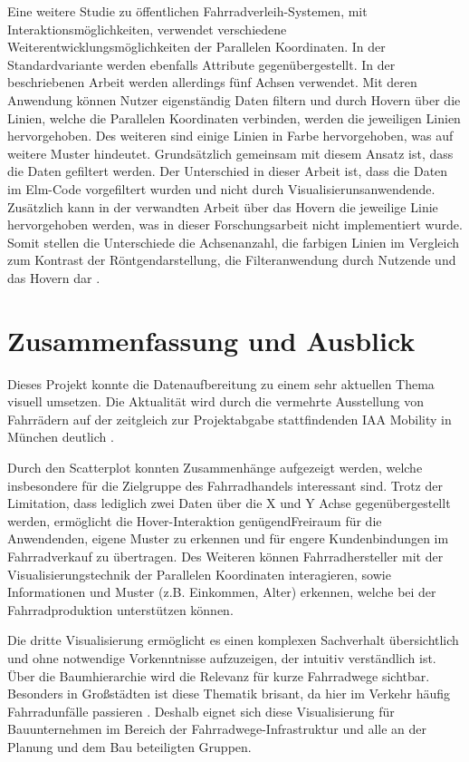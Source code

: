 \documentclass[usegeometry=true]{scrartcl}
\begin{document}
Eine weitere Studie zu öffentlichen Fahrradverleih-Systemen, mit Interaktionsmöglichkeiten, verwendet verschiedene Weiterentwicklungsmöglichkeiten der  Parallelen Koordinaten. In der Standardvariante werden ebenfalls Attribute gegenübergestellt. In der beschriebenen Arbeit werden allerdings fünf Achsen verwendet. Mit deren Anwendung können Nutzer eigenständig Daten filtern und durch Hovern über die Linien, welche die Parallelen Koordinaten verbinden, werden die jeweiligen Linien hervorgehoben. Des weiteren sind einige Linien in Farbe hervorgehoben, was auf weitere Muster hindeutet. Grundsätzlich gemeinsam mit diesem Ansatz ist, dass die Daten gefiltert werden. Der Unterschied in dieser Arbeit ist, dass die Daten im Elm-Code vorgefiltert wurden und nicht durch Visualisierunsanwendende. Zusätzlich kann in der verwandten Arbeit über das Hovern die jeweilige Linie hervorgehoben werden, was in dieser Forschungsarbeit nicht implementiert wurde. Somit stellen die Unterschiede die Achsenanzahl, die farbigen Linien im Vergleich zum Kontrast der Röntgendarstellung, die Filteranwendung durch Nutzende und das Hovern dar \cite{Shi.2018}.  
\section{Zusammenfassung und Ausblick}

Dieses Projekt konnte die Datenaufbereitung zu einem sehr aktuellen Thema visuell umsetzen. Die Aktualität wird durch die vermehrte Ausstellung von Fahrrädern auf der zeitgleich zur Projektabgabe stattfindenden IAA Mobility in München deutlich \cite{.08.09.2021}.

Durch den Scatterplot konnten Zusammenhänge aufgezeigt werden, welche insbesondere für die Zielgruppe des Fahrradhandels interessant sind. Trotz der Limitation, dass lediglich zwei Daten über die X und Y Achse gegenübergestellt werden, ermöglicht die Hover-Interaktion genügendFreiraum für die Anwendenden, eigene Muster zu erkennen und für engere Kundenbindungen im Fahrradverkauf zu übertragen. 
Des Weiteren können Fahrradhersteller mit der Visualisierungstechnik der Parallelen Koordinaten interagieren, sowie Informationen und Muster (z.B. Einkommen, Alter) erkennen, welche bei der Fahrradproduktion unterstützen können.

Die dritte Visualisierung ermöglicht es einen komplexen Sachverhalt übersichtlich und ohne notwendige Vorkenntnisse aufzuzeigen, der intuitiv verständlich ist. Über die Baumhierarchie wird die Relevanz für kurze Fahrradwege sichtbar.
Besonders in Großstädten ist diese Thematik brisant, da hier im Verkehr häufig Fahrradunfälle passieren \cite{Reek.17.03.2021,Nogly.2014,tagesschau.20.08.2021}. Deshalb eignet sich diese Visualisierung für Bauunternehmen im Bereich der Fahrradwege-Infrastruktur und alle an der Planung und dem Bau beteiligten Gruppen.
\end{document}
